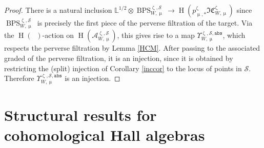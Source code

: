 \documentclass[a4paper,10pt]{amsart}
\renewcommand{\zeta}{\upzeta}
\renewcommand{\Lambda}{\Uplambda}
\renewcommand{\mu}{\upmu}
\newtheorem{definition}[theorem]{Definition}
\newcommand{\ab}{\mathtt{abs}}
\DeclareMathOperator{\BC}{B\mathbb{C}^*}
\newcommand{\LL}{\mathbb{L}}
\newcommand{\SP}{\mathcal{S}}
\newcommand{\Mst}{\mathfrak{M}}
\newcommand{\Msp}{\mathcal{M}}
\newcommand{\ICSt}{\mathfrak{IC}}
\newcommand{\DTS}{\mathcal{BPS}}
\DeclareMathOperator{\sst}{-ss}
\DeclareMathOperator{\MMHM}{MMHM}
\DeclareMathOperator{\mos}{\tilde{\cdot}}
\DeclareMathOperator{\MHM}{MHM}
\DeclareMathOperator{\DT}{BPS}
\DeclareMathOperator{\vir}{vir}
\DeclareMathOperator{\HO}{H}
\newcommand{\Du}{\mathcal{D}^{\geq}}
\begin{document}
\begin{proof}
There is a natural inclusion $\LL^{1/2}\otimes\DT^{\zeta,\SP}_{W,\mu}\rightarrow \HO\left(p_{\mu,*}^{\zeta}\ICSt_{W,\mu}^{\zeta}\right)$ since $\DT^{\zeta,\SP}_{W,\mu}$ is precisely the first piece of the perverse filtration of the target.  Via the $\HO(\BC)$-action on $\HO\left(\mathcal{A}^{\zeta,\SP}_{W,\mu}\right)$, this gives rise to a map $\Upsilon_{W,\mu}^{\zeta,\SP,\ab}$, which respects the perverse filtration by Lemma \ref{HCM}.  After passing to the associated graded of the perverse filtration, it is an injection, since it is obtained by restricting the (split) injection of Corollary \ref{inccor} to the locus of points in $\SP$.  Therefore $\Upsilon_{W,\mu}^{\zeta,\SP,\ab}$ is an injection.
\end{proof}

\section{Structural results for cohomological Hall algebras}
\label{PBWsec}
\end{document}
